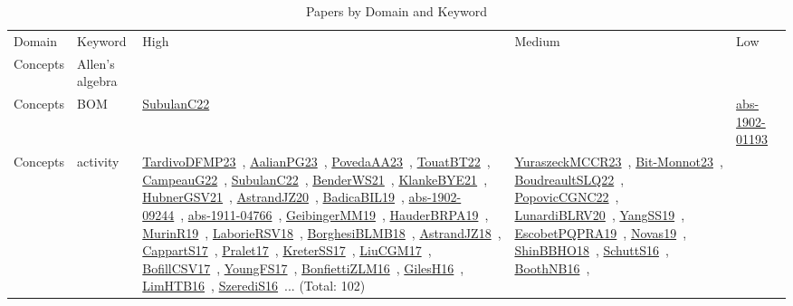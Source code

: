 {\scriptsize
\begin{longtable}{lp{3cm}>{\raggedright\arraybackslash}p{6cm}>{\raggedright\arraybackslash}p{6cm}>{\raggedright\arraybackslash}p{8cm}}
\rowcolor{white}\caption{Papers by Domain and Keyword}\\ \toprule
\rowcolor{white}Domain & Keyword & High & Medium & Low\\ \midrule\endhead
\bottomrule
\endfoot
Concepts & Allen's algebra &  &  & \\
Concepts & BOM & \href{articles/SubulanC22.pdf}{SubulanC22}~\cite{SubulanC22} &  & \href{articles/abs-1902-01193.pdf}{abs-1902-01193}~\cite{abs-1902-01193}\\
Concepts & activity & \href{papers/TardivoDFMP23.pdf}{TardivoDFMP23}~\cite{TardivoDFMP23}, \href{papers/AalianPG23.pdf}{AalianPG23}~\cite{AalianPG23}, \href{papers/PovedaAA23.pdf}{PovedaAA23}~\cite{PovedaAA23}, \href{papers/TouatBT22.pdf}{TouatBT22}~\cite{TouatBT22}, \href{articles/CampeauG22.pdf}{CampeauG22}~\cite{CampeauG22}, \href{articles/SubulanC22.pdf}{SubulanC22}~\cite{SubulanC22}, \href{papers/BenderWS21.pdf}{BenderWS21}~\cite{BenderWS21}, \href{papers/KlankeBYE21.pdf}{KlankeBYE21}~\cite{KlankeBYE21}, \href{articles/HubnerGSV21.pdf}{HubnerGSV21}~\cite{HubnerGSV21}, \href{articles/AstrandJZ20.pdf}{AstrandJZ20}~\cite{AstrandJZ20}, \href{papers/BadicaBIL19.pdf}{BadicaBIL19}~\cite{BadicaBIL19}, \href{articles/abs-1902-09244.pdf}{abs-1902-09244}~\cite{abs-1902-09244}, \href{articles/abs-1911-04766.pdf}{abs-1911-04766}~\cite{abs-1911-04766}, \href{papers/GeibingerMM19.pdf}{GeibingerMM19}~\cite{GeibingerMM19}, \href{articles/HauderBRPA19.pdf}{HauderBRPA19}~\cite{HauderBRPA19}, \href{papers/MurinR19.pdf}{MurinR19}~\cite{MurinR19}, \href{articles/LaborieRSV18.pdf}{LaborieRSV18}~\cite{LaborieRSV18}, \href{articles/BorghesiBLMB18.pdf}{BorghesiBLMB18}~\cite{BorghesiBLMB18}, \href{papers/AstrandJZ18.pdf}{AstrandJZ18}~\cite{AstrandJZ18}, \href{papers/CappartS17.pdf}{CappartS17}~\cite{CappartS17}, \href{papers/Pralet17.pdf}{Pralet17}~\cite{Pralet17}, \href{articles/KreterSS17.pdf}{KreterSS17}~\cite{KreterSS17}, \href{papers/LiuCGM17.pdf}{LiuCGM17}~\cite{LiuCGM17}, \href{papers/BofillCSV17.pdf}{BofillCSV17}~\cite{BofillCSV17}, \href{papers/YoungFS17.pdf}{YoungFS17}~\cite{YoungFS17}, \href{papers/BonfiettiZLM16.pdf}{BonfiettiZLM16}~\cite{BonfiettiZLM16}, \href{papers/GilesH16.pdf}{GilesH16}~\cite{GilesH16}, \href{papers/LimHTB16.pdf}{LimHTB16}~\cite{LimHTB16}, \href{papers/SzerediS16.pdf}{SzerediS16}~\cite{SzerediS16}... (Total: 102) & \href{articles/YuraszeckMCCR23.pdf}{YuraszeckMCCR23}~\cite{YuraszeckMCCR23}, \href{papers/Bit-Monnot23.pdf}{Bit-Monnot23}~\cite{Bit-Monnot23}, \href{papers/BoudreaultSLQ22.pdf}{BoudreaultSLQ22}~\cite{BoudreaultSLQ22}, \href{papers/PopovicCGNC22.pdf}{PopovicCGNC22}~\cite{PopovicCGNC22}, \href{articles/LunardiBLRV20.pdf}{LunardiBLRV20}~\cite{LunardiBLRV20}, \href{papers/YangSS19.pdf}{YangSS19}~\cite{YangSS19}, \href{articles/EscobetPQPRA19.pdf}{EscobetPQPRA19}~\cite{EscobetPQPRA19}, \href{articles/Novas19.pdf}{Novas19}~\cite{Novas19}, \href{articles/ShinBBHO18.pdf}{ShinBBHO18}~\cite{ShinBBHO18}, \href{papers/SchuttS16.pdf}{SchuttS16}~\cite{SchuttS16}, \href{papers/BoothNB16.pdf}{BoothNB16}~\cite{BoothNB16}, 
\end{longtable}}
